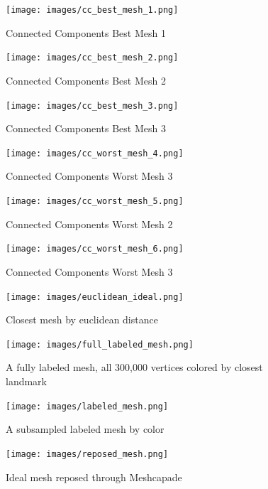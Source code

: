 \begin{figure}[!htb]
        \caption{Connected Components Best Mesh 1}
        \centering
        \texttt{[image: images/cc\_best\_mesh\_1.png]}
\end{figure}
\begin{figure}[!htb]
        \caption{Connected Components Best Mesh 2}
        \centering
        \texttt{[image: images/cc\_best\_mesh\_2.png]}
\end{figure}
\begin{figure}[!htb]
        \caption{Connected Components Best Mesh 3}
        \centering
        \texttt{[image: images/cc\_best\_mesh\_3.png]}
\end{figure}

\begin{figure}[!htb]
        \caption{Connected Components Worst  Mesh 3}
        \centering
        \texttt{[image: images/cc\_worst\_mesh\_4.png]}
\end{figure}

\begin{figure}[!htb]
        \caption{Connected Components Worst  Mesh 2}
        \centering
        \texttt{[image: images/cc\_worst\_mesh\_5.png]}
\end{figure}

\begin{figure}[!htb]
        \caption{Connected Components Worst  Mesh 3}
        \centering
        \texttt{[image: images/cc\_worst\_mesh\_6.png]}
\end{figure}

\begin{figure}[!htb]
        \caption{Closest mesh by euclidean distance}
        \centering
        \texttt{[image: images/euclidean\_ideal.png]}
\end{figure}

\begin{figure}[!htb]
        \caption{A fully labeled mesh, all 300,000 vertices colored by closest landmark}
        \centering
        \texttt{[image: images/full\_labeled\_mesh.png]}
\end{figure}

\begin{figure}[!htb]
        \caption{A subsampled labeled mesh by color}
        \centering
        \texttt{[image: images/labeled\_mesh.png]}
\end{figure}

\begin{figure}[!htb]
        \caption{Ideal mesh reposed through Meshcapade}
        \centering
        \texttt{[image: images/reposed\_mesh.png]}
\end{figure}

